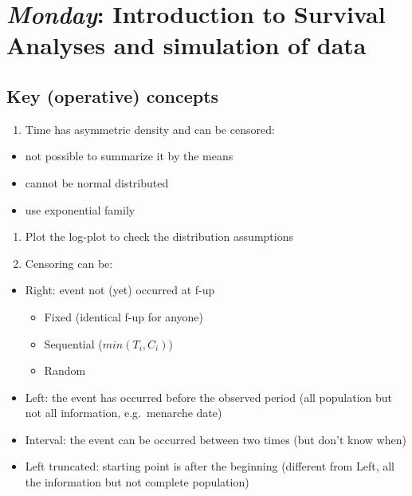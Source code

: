 \documentclass[]{book}
\providecommand{\tightlist}{%
  \setlength{\itemsep}{0pt}\setlength{\parskip}{0pt}}
\theoremstyle{definition}
\theoremstyle{definition}
\theoremstyle{definition}
\theoremstyle{remark}
\begin{document}
\chapter{\texorpdfstring{\emph{Monday}: Introduction to Survival
Analyses and simulation of
data}{Monday: Introduction to Survival Analyses and simulation of data}}\label{survival}

\section{Key (operative) concepts}\label{key1}

\begin{enumerate}
\def\labelenumi{\arabic{enumi}.}
\tightlist
\item
  Time has asymmetric density and can be censored:
\end{enumerate}

\begin{itemize}
\tightlist
\item
  not possible to summarize it by the means
\item
  cannot be normal distributed
\item
  use exponential family
\end{itemize}

\begin{enumerate}
\def\labelenumi{\arabic{enumi}.}
\setcounter{enumi}{1}
\item
  Plot the log-plot to check the distribution assumptions
\item
  Censoring can be:
\end{enumerate}

\begin{itemize}
\tightlist
\item
  Right: event not (yet) occurred at f-up

  \begin{itemize}
  \tightlist
  \item
    Fixed (identical f-up for anyone)
  \item
    Sequential (\(min(T_i, C_i)\))
  \item
    Random
  \end{itemize}
\item
  Left: the event has occurred before the observed period (all
  population but not all information, e.g.~menarche date)
\item
  Interval: the event can be occurred between two times (but don't know
  when)
\item
  Left truncated: starting point is after the beginning (different from
  Left, all the information but not complete population)
\end{itemize}
\end{document}
